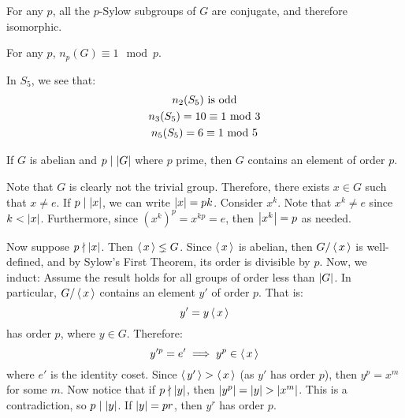 \begin{thm}[title=Third(?) Sylow Theorem]
    For any $ p $, all the $ p $-Sylow subgroups of $ G $ are conjugate, and therefore isomorphic.
\end{thm}

\begin{thm}[title=Fourth(?) Sylow Theorem]
    For any $ p $, $ n_{p}(G) \equiv 1 \mod p $.
\end{thm}

\begin{xmp}[source=Primary Source Material]
    In $ S_{5} $, we see that:
    \begin{gather*}
        n_{2}(S_{5}) \textrm{ is odd} \\
        n_{3}(S_{5}) = 10 \equiv 1 \ \mathrm{mod}\ 3 \\
        n_{5}(S_{5}) = 6 \equiv 1 \ \mathrm{mod}\ 5
    \end{gather*}
\end{xmp}

\newpage
{}

\begin{thm}[title=Cauchy's Theorem on Abelian Groups]
    If $ G $ is abelian and $ p \mid \abs{G} $ where $ p $ prime,
    then $ G $ contains an element of order $ p $.
\end{thm}

\begin{pf}[source=Primary Source Material]
    Note that $ G $ is clearly not the trivial group.
    Therefore, there exists $ x \in G $ such that $ x \neq e $. \vsp
    If $ p \mid \abs{x} $, we can write $ \abs{x} = pk $.
    Consider $ x^{k} $. Note that $ x^{k} \neq e $ since $ k < \abs{x} $.
    Furthermore, since $ (x^{k})^{p} = x^{kp} = e $, then $ \abs{x^{k}} = p $ as needed. \npgh

    Now suppose $ p \nmid \abs{x} $. Then $ \operatorname{\langle} x \operatorname{\rangle} \lneq G $.
    Since $ \operatorname{\langle} x \operatorname{\rangle} $ is abelian, then $ G/\operatorname{\langle} x \operatorname{\rangle} $ is well-defined, and by Sylow's First
    Theorem, its order is divisible by $ p $. \vsp
    Now, we induct: Assume the result holds for all groups of order less than $ \abs{G} $.
    In particular, $ G/\operatorname{\langle} x \operatorname{\rangle} $ contains an element $ y' $ of order $ p $. That is:
    \begin{equation*}
        y' = y\operatorname{\langle} x \operatorname{\rangle}
    \end{equation*}
    has order $ p $, where $ y \in G $. Therefore:
    \begin{equation*}
        y'^{p} = e' \implies y^{p} \in \operatorname{\langle} x \operatorname{\rangle}
    \end{equation*}
    where $ e' $ is the identity coset. \vsp
    Since $ \operatorname{\langle} y' \operatorname{\rangle} > \operatorname{\langle} x \operatorname{\rangle} $ (as $ y' $ has order $ p $), then $ y^{p} = x^{m} $
    for some $ m $. Now notice that if $ p \nmid \abs{y} $,
    then $ \abs{y^{p}} = \abs{y} > \abs{x^{m}} $.
    This is a contradiction, so $ p \mid \abs{y} $. If $ \abs{y} = pr $,
    then $ y^{r} $ has order $ p $.
\end{pf}

